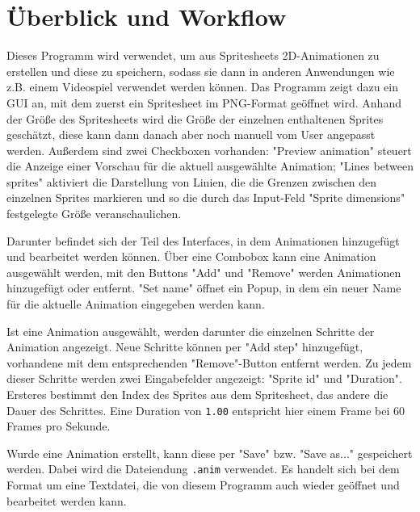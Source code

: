 \chapter{Überblick und Workflow}
Dieses Programm wird verwendet, um aus Spritesheets 2D-Animationen zu erstellen und diese zu speichern, sodass sie dann in anderen Anwendungen wie z.B. einem Videospiel verwendet werden können. Das Programm zeigt dazu ein GUI an, mit dem zuerst ein Spritesheet im PNG-Format geöffnet wird. Anhand der Größe des Spritesheets wird die Größe der einzelnen enthaltenen Sprites geschätzt, diese kann dann danach aber noch manuell vom User angepasst werden. Außerdem sind zwei Checkboxen vorhanden: "Preview animation" steuert die Anzeige einer Vorschau für die aktuell ausgewählte Animation; "Lines between sprites" aktiviert die Darstellung von Linien, die die Grenzen zwischen den einzelnen Sprites markieren und so die durch das Input-Feld "Sprite dimensions" festgelegte Größe veranschaulichen.

Darunter befindet sich der Teil des Interfaces, in dem Animationen hinzugefügt und bearbeitet werden können. Über eine Combobox kann eine Animation ausgewählt werden, mit den Buttons "Add" und "Remove" werden Animationen hinzugefügt oder entfernt. "Set name" öffnet ein Popup, in dem ein neuer Name für die aktuelle Animation eingegeben werden kann.

Ist eine Animation ausgewählt, werden darunter die einzelnen Schritte der Animation angezeigt. Neue Schritte können per "Add step" hinzugefügt, vorhandene mit dem entsprechenden "Remove"-Button entfernt werden. Zu jedem dieser Schritte werden zwei Eingabefelder angezeigt: "Sprite id" und "Duration". Ersteres bestimmt den Index des Sprites aus dem Spritesheet, das andere die Dauer des Schrittes. Eine Duration von \lstinline{1.00} entspricht hier einem Frame bei 60 Frames pro Sekunde.

Wurde eine Animation erstellt, kann diese per "Save" bzw. "Save as..." gespeichert werden. Dabei wird die Dateiendung \lstinline{.anim} verwendet. Es handelt sich bei dem Format um eine Textdatei, die von diesem Programm auch wieder geöffnet und bearbeitet werden kann.